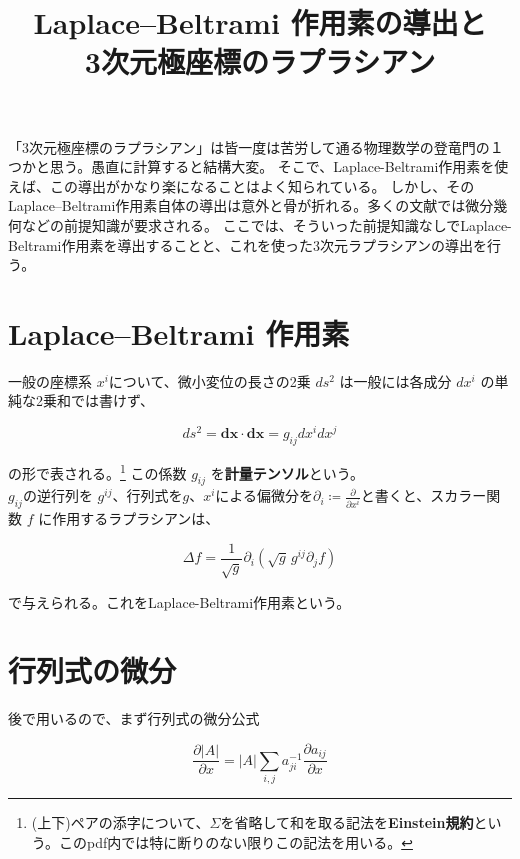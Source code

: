 \documentclass[a4paper,11pt]{article}
\title{\vspace{-40mm}Laplace–Beltrami 作用素の導出と\\3次元極座標のラプラシアン}
\author{}
\begin{document}
\maketitle

「3次元極座標のラプラシアン」は皆一度は苦労して通る物理数学の登竜門の１つかと思う。愚直に計算すると結構大変。
そこで、Laplace-Beltrami作用素を使えば、この導出がかなり楽になることはよく知られている。
しかし、そのLaplace–Beltrami作用素自体の導出は意外と骨が折れる。多くの文献では微分幾何などの前提知識が要求される。
ここでは、そういった前提知識なしでLaplace-Beltrami作用素を導出することと、これを使った3次元ラプラシアンの導出を行う。

\section{Laplace–Beltrami 作用素}

一般の座標系 $x^i$について、微小変位の長さの2乗 $ds^2$ は一般には各成分 $dx^i$ の単純な2乗和では書けず、

\begin{equation}
  ds^2 = \mathbf{dx}\cdot\mathbf{dx} = g_{ij}dx^{i}dx^{j}
\end{equation}

\noindent
の形で表される。\footnote{
  (上下)ペアの添字について、$\Sigma$を省略して和を取る記法を\textbf{Einstein規約}という。このpdf内では特に断りのない限りこの記法を用いる。
}
この係数 $g_{ij}$ を\textbf{計量テンソル}という。\\
$g_{ij}$の逆行列を $g^{ij}$、行列式を$g$、$x^i$による偏微分を$\partial_{i}\coloneqq \frac{\partial}{\partial x^{i}}$と書くと、スカラー関数 $f$ に作用するラプラシアンは、

\begin{equation}
  \boxed{
    \Delta f
    =
    \frac{1}{\sqrt{g}}
    \partial_i
    \left(
    \sqrt{g}\, g^{ij} \partial_j f
    \right)
  }
\end{equation}

\noindent
で与えられる。これをLaplace-Beltrami作用素という。

\section{行列式の微分}

後で用いるので、まず行列式の微分公式

\begin{equation}
  \boxed{
    \frac{\partial |A|}{\partial x} = |A|\sum_{i,j} a^{-1}_{ji}\frac{\partial a_{ij}}{\partial x}
    \label{eq:det_diff}
  }
\end{equation}
\end{document}
